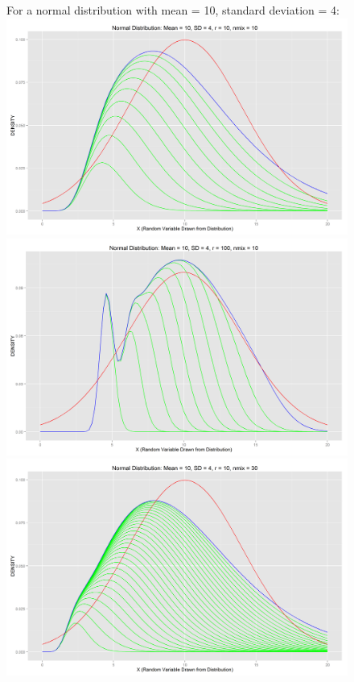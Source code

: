 \documentclass[letter]{article}
\begin{document}
\begin{figure}[H]
\centering
\newpage
\Large{For a normal distribution with mean = 10, standard deviation = 4:}\\
\includegraphics[scale=.27]{normdist_10_4_10_10.png}
\includegraphics[scale=.27]{normdist_10_4_100_10.png}\\
\includegraphics[scale=.27]{normdist_10_4_10_30.png}

\end{figure}
\end{document}
